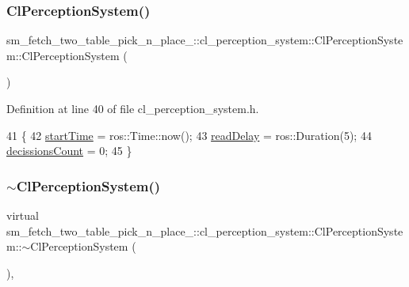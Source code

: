 \subsubsection{\texorpdfstring{Cl\+Perception\+System()}{ClPerceptionSystem()}}
{\footnotesize\ttfamily sm\+\_\+fetch\+\_\+two\+\_\+table\+\_\+pick\+\_\+n\+\_\+place\+\_\+::cl\+\_\+perception\+\_\+system\+::\+Cl\+Perception\+System\+::\+Cl\+Perception\+System (\begin{DoxyParamCaption}{ }\end{DoxyParamCaption})\hspace{0.3cm}{\ttfamily [inline]}}



Definition at line 40 of file cl\+\_\+perception\+\_\+system.\+h.


\begin{DoxyCode}
41     \{
42         \hyperlink{classsm__fetch__two__table__pick__n__place__1_1_1cl__perception__system_1_1ClPerceptionSystem_a3b88edd8d62e132052c3f0908839dbb1}{startTime} = ros::Time::now();
43         \hyperlink{classsm__fetch__two__table__pick__n__place__1_1_1cl__perception__system_1_1ClPerceptionSystem_aa10a1ed21636e7bdf001895860075383}{readDelay} = ros::Duration(5);
44         \hyperlink{classsm__fetch__two__table__pick__n__place__1_1_1cl__perception__system_1_1ClPerceptionSystem_a3639b112c2051d9d5f15716c8a72f127}{decissionsCount} = 0;
45     \}
\end{DoxyCode}
\mbox{\label{classsm__fetch__two__table__pick__n__place__1_1_1cl__perception__system_1_1ClPerceptionSystem_a81883848ef4447a0708e8b7e391a5833}} 
\subsubsection{\texorpdfstring{$\sim$\+Cl\+Perception\+System()}{~ClPerceptionSystem()}}
{\footnotesize\ttfamily virtual sm\+\_\+fetch\+\_\+two\+\_\+table\+\_\+pick\+\_\+n\+\_\+place\+\_\+::cl\+\_\+perception\+\_\+system\+::\+Cl\+Perception\+System\+::$\sim$\+Cl\+Perception\+System (\begin{DoxyParamCaption}{ }\end{DoxyParamCaption})\hspace{0.3cm}{\ttfamily [inline]}, {\ttfamily [virtual]}}



